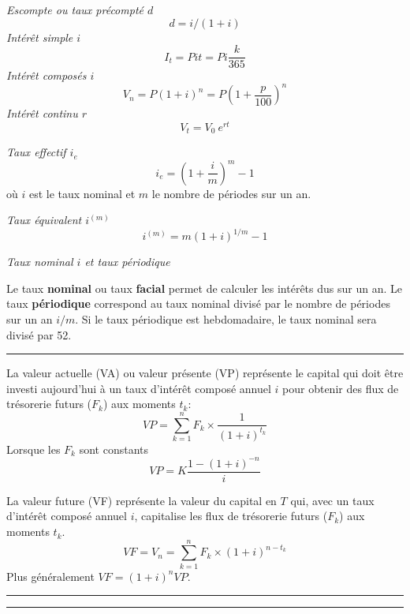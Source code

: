 \begin{f}

\emph{Escompte ou taux précompté $d$}
     $$d=i/(1+i)$$
\emph{Intérêt simple $i$}
$$
I_t=P i t=P i \frac{k}{365}
$$
\emph{Intérêt composés $i$}
$$
V_n=P(1+i)^n=P\left(1+\frac{p}{100}\right)^n
$$
\emph{Intérêt continu $r$}
$$V_t=V_0\ e^{rt}$$

\emph{Taux effectif $i_e$}
$$
i_e=\left( 1+\frac{i}{m}\right) ^{m}-1
$$
où $i$ est le taux nominal et $m$ le nombre de périodes sur un an.

\emph{Taux équivalent $i^{(m)}$}
$$
i^{(m)}=m(1+i)^{1 / m}-1
$$

\emph{Taux nominal $i$ et taux périodique}

Le taux \textbf{nominal} ou taux \textbf{facial} permet de calculer les intérêts dus sur un an.
Le taux \textbf{périodique} correspond au taux nominal divisé par le nombre de périodes sur un an $i/m$.
Si le taux périodique est hebdomadaire, le taux nominal sera divisé par 52.
\end{f}
\hrule

\begin{f}

La valeur actuelle (VA)  ou valeur présente (VP)  représente le capital qui doit être investi aujourd'hui à un taux d'intérêt composé annuel $i$ pour obtenir des flux de trésorerie futurs ($F_k$) aux moments $t_k$:
\begin{equation}
	VP = \sum_{k=1}^{n} F_k \times \frac{1}{(1+i)^{t_k}}
\label{ValeurActuelle}
\end{equation}
Lorsque les $F_k$ sont constants
\begin{equation}
	VP = K  \frac{1 - (1+i)^{-n}} {i}
\label{ValeurActuelleFluxCt}
\end{equation}

La valeur future (VF) représente la valeur du capital en $T$ qui, avec un taux d'intérêt composé annuel $i$,  capitalise les flux de trésorerie futurs ($F_k$) aux moments $t_k$.
\begin{equation}
	VF=V_n = \sum_{k=1}^{n} F_k \times (1+i)^{n-t_k}
\end{equation}
Plus généralement $VF= (1+i)^{n}VP$.
\end{f}
\hrule

\begin{f}[Annuités]

\end{f}
\hrule

